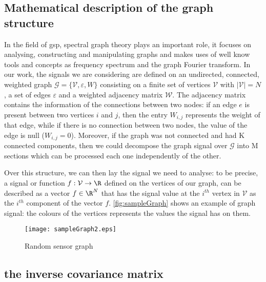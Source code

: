 \subsection{Mathematical description of the graph structure}
In the field of \gls{gsp}, spectral graph theory plays an important role, it focuses on analysing, constructing and manipulating graphs and makes uses of well know tools and concepts as frequency spectrum and the graph Fourier transform. In our work, the signals we are considering are defined on an undirected, connected, weighted graph $\mathcal{G} = \{ \mathcal{V}, \varepsilon, W\}$ consisting on a finite set of vertices $\mathcal{V}$ with $|\mathcal{V}| = N$, a set of edges $\varepsilon$ and a weighted adjacency matrix $\mathcal{W}$. The adjacency matrix contains the information of the connections between two nodes: if an edge $e$ is present between two vertices $i$ and $j$, then the entry $W_{i,j}$ represents the weight of that edge, while if there is no connection between two nodes, the value of the edge is null ($W_{i,j} = 0$). Moreover, if the graph was not connected and had K connected components, then we could decompose the graph signal over $\mathcal{G}$ into M sections which can be processed each one independently of the other.

Over this structure, we can then lay  the signal we need to analyse: to be precise, a signal or function $f: \mathcal{V} \to \R$ defined on the vertices of our graph, can be described as a vector $f \in \R^N$ that has the signal value at the $i^{th}$ vertex in $\mathcal{V}$ as the $i^{th}$ component of the vector $f$. \autoref{fig:sampleGraph} shows an example of graph signal: the colours of the vertices represents the values the signal has on them.

\begin{figure}
  \centering
  \texttt{[image: sampleGraph2.eps]}
  \caption{Random sensor graph}
  \label{fig:sampleGraph}
\end{figure}
\subsection{the inverse covariance matrix}

